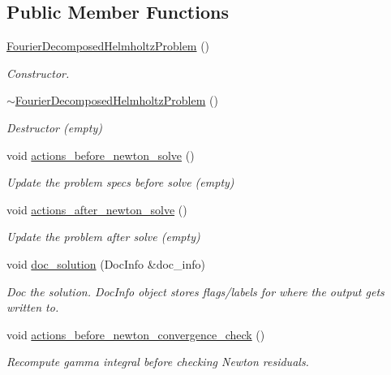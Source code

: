 \subsection*{Public Member Functions}
\begin{DoxyCompactItemize}
\item 
\hyperlink{classFourierDecomposedHelmholtzProblem_ab368ed8fe04d4e3db67d13bab9e7b52e}{Fourier\+Decomposed\+Helmholtz\+Problem} ()
\begin{DoxyCompactList}\small\item\em Constructor. \end{DoxyCompactList}\item 
\hyperlink{classFourierDecomposedHelmholtzProblem_a03174fa5a35b7c38f08f91bcd2a80c20}{$\sim$\+Fourier\+Decomposed\+Helmholtz\+Problem} ()
\begin{DoxyCompactList}\small\item\em Destructor (empty) \end{DoxyCompactList}\item 
void \hyperlink{classFourierDecomposedHelmholtzProblem_a82ef5a969f4404fc1acb35c38c800ce6}{actions\+\_\+before\+\_\+newton\+\_\+solve} ()
\begin{DoxyCompactList}\small\item\em Update the problem specs before solve (empty) \end{DoxyCompactList}\item 
void \hyperlink{classFourierDecomposedHelmholtzProblem_a5a37ba3fcf8563764f80108c9a657929}{actions\+\_\+after\+\_\+newton\+\_\+solve} ()
\begin{DoxyCompactList}\small\item\em Update the problem after solve (empty) \end{DoxyCompactList}\item 
void \hyperlink{classFourierDecomposedHelmholtzProblem_a893efb01f8f1d254315201121766d882}{doc\+\_\+solution} (Doc\+Info \&doc\+\_\+info)
\begin{DoxyCompactList}\small\item\em Doc the solution. Doc\+Info object stores flags/labels for where the output gets written to. \end{DoxyCompactList}\item 
void \hyperlink{classFourierDecomposedHelmholtzProblem_ae80673ef299e4935ddcac177ed919da3}{actions\+\_\+before\+\_\+newton\+\_\+convergence\+\_\+check} ()
\begin{DoxyCompactList}\small\item\em Recompute gamma integral before checking Newton residuals. \end{DoxyCompactList}\item 

\end{DoxyCompactItemize}
